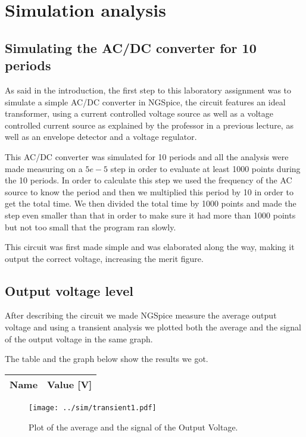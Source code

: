 \section{Simulation analysis}
\label{sec:simulation}

\subsection{Simulating the AC/DC converter for 10 periods}
As said in the introduction, the first step to this laboratory assignment was to simulate a simple AC/DC converter in NGSpice, the circuit features an ideal transformer, using a current controlled voltage source as well as a voltage controlled current source as explained by the professor in a previous lecture, as well as an envelope detector and a voltage regulator. \par
This AC/DC converter was simulated for 10 periods and all the analysis were made measuring on a $5e-5$ step in order to evaluate at least 1000 points during the 10 periods. In order to calculate this step we used the frequency of the AC source to know the period and then we multiplied this period by 10 in order to get the total time. We then divided the total time by 1000 points and made the step even smaller than that in order to make sure it had more than 1000 points but not too small that the program ran slowly. \par
This circuit was first made simple and was elaborated along the way, making it output the correct voltage, increasing the merit figure.

\subsection{Output voltage level}
After describing the circuit we made NGSpice measure the average output voltage and using a transient analysis we plotted both the average and the signal of the output voltage in the same graph. \par
The table and the graph below show the results we got.

\begin{table}[H]
  \centering
  \begin{tabular}{|l|r|}
    \hline    
    {\bf Name} & {\bf Value [V]} \\ \hline
    
  \end{tabular}
  \label{tab:average}
\end{table}

\begin{figure}[H] \centering
\texttt{[image: ../sim/transient1.pdf]}
\caption{Plot of the average and the signal of the Output Voltage.}
\label{fig:transient1}
\end{figure}

